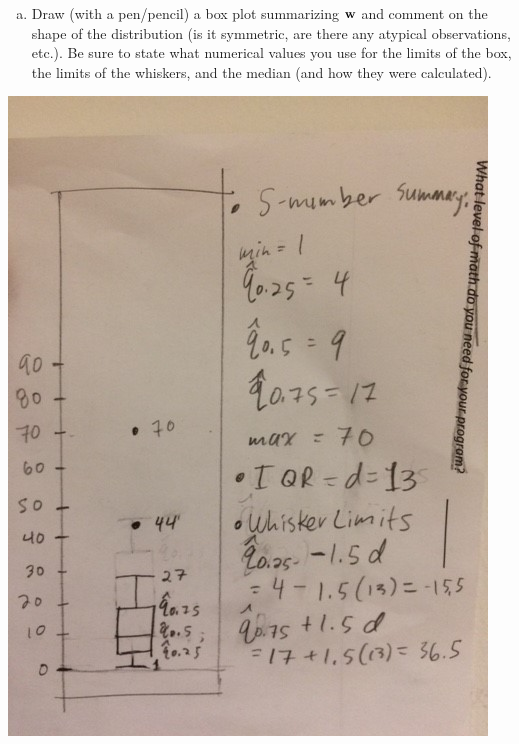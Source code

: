 \documentclass[letterpaper,12pt,fleqn]{article}
\begin{document}
\begin{enumerate}
\begin{enumerate}[a)]
(2) To find the five number summary using R, the following command works and produces the output shown:

\texttt{quantile(w, type = 1)} \\
\texttt{0\%  25\%  50\%  75\% 100\%}  \\
\texttt{1\quad {}     } \\


\item Draw (with a pen/pencil) a box plot summarizing ${\bf w}$ and comment on the shape of the distribution (is it symmetric, are there any atypical observations, etc.).  Be sure to state what numerical values you use for the limits of the box, the limits of the whiskers, and the median (and how they were calculated).\\


\end{enumerate}

\begin{center}
    \includegraphics[scale=0.6]{IMG_2605}
\end{center}


\end{enumerate}
\end{document}
